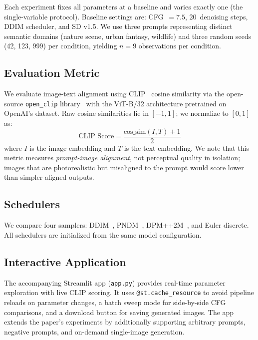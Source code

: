\documentclass{article}
\begin{document}
Each experiment fixes all parameters at a baseline and varies exactly one
(the single-variable protocol).
Baseline settings are: CFG~$= 7.5$, 20~denoising steps, DDIM scheduler,
and SD v1.5.
We use three prompts representing distinct semantic domains (nature scene,
urban fantasy, wildlife) and three random seeds (42, 123, 999) per condition,
yielding $n = 9$ observations per condition.

\subsection{Evaluation Metric}

We evaluate image-text alignment using CLIP~\citep{radford2021clip}
cosine similarity via the open-source \texttt{open\_clip} library~\citep{ilharco2021openclip}
with the ViT-B/32 architecture pretrained on OpenAI's dataset.
Raw cosine similarities lie in $[-1, 1]$; we normalize to $[0, 1]$ as:
\begin{equation}
  \text{CLIP Score} = \frac{\text{cos\_sim}(I, T) + 1}{2}
  \label{eq:clip}
\end{equation}
where $I$ is the image embedding and $T$ is the text embedding.
We note that this metric measures \emph{prompt-image alignment}, not
perceptual quality in isolation; images that are photorealistic but
misaligned to the prompt would score lower than simpler aligned outputs.

\subsection{Schedulers}

We compare four samplers: DDIM~\citep{song2021ddim},
PNDM~\citep{liu2022pndm}, DPM++2M~\citep{lu2022dpm}, and
Euler discrete.
All schedulers are initialized from the same model configuration.

\subsection{Interactive Application}

The accompanying Streamlit app (\texttt{app.py}) provides real-time
parameter exploration with live CLIP scoring.
It uses \texttt{@st.cache\_resource} to avoid pipeline reloads on parameter changes,
a batch sweep mode for side-by-side CFG comparisons, and a download button for
saving generated images.
The app extends the paper's experiments by additionally supporting arbitrary prompts,
negative prompts, and on-demand single-image generation.
\end{document}
